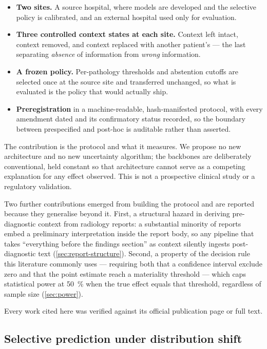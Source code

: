 \begin{itemize}
  \item \textbf{Two sites.} A source hospital, where models are developed and
    the selective policy is calibrated, and an external hospital used only for
    evaluation.
  \item \textbf{Three controlled context states at each site.} Context left
    intact, context removed, and context replaced with another patient's ---
    the last separating \emph{absence} of information from \emph{wrong}
    information.
  \item \textbf{A frozen policy.} Per-pathology thresholds and abstention
    cutoffs are selected once at the source site and transferred unchanged, so
    what is evaluated is the policy that would actually ship.
  \item \textbf{Preregistration} in a machine-readable, hash-manifested
    protocol, with every amendment dated and its confirmatory status recorded,
    so the boundary between prespecified and post-hoc is auditable rather than
    asserted.
\end{itemize}

The contribution is the protocol and what it measures. We propose no new
architecture and no new uncertainty algorithm; the backbones are deliberately
conventional, held constant so that architecture cannot serve as a competing
explanation for any effect observed. This is not a prospective clinical study or
a regulatory validation.

Two further contributions emerged from building the protocol and are reported
because they generalise beyond it. First, a structural hazard in deriving
pre-diagnostic context from radiology reports: a substantial minority of reports
embed a preliminary interpretation inside the report body, so any pipeline that
takes ``everything before the findings section'' as context silently ingests
post-diagnostic text (\cref{sec:report-structure}). Second, a property of the
decision rule this literature commonly uses --- requiring both that a confidence
interval exclude zero and that the point estimate reach a materiality threshold
--- which caps statistical power at \SI{50}{\percent} when the true effect
equals that threshold, regardless of sample size (\cref{sec:power}).

\label{sec:related-work}

Every work cited here was verified against its official publication page or
full text.

\subsection{Selective prediction under distribution shift}

